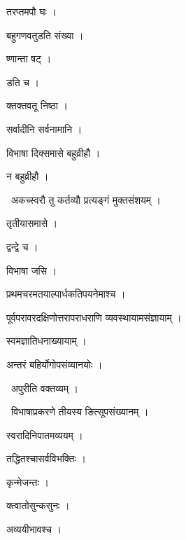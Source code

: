 \documentclass[10pt, openany, oneside]{book}
\begin{document}
\noindent तरप्तमपौ घः ।

\noindent बहुगणवतुडति संख्या ।

\noindent ष्णान्ता षट् ।

\noindent डति च ।

\noindent क्तक्तवतू निष्ठा ।

\noindent सर्वादीनि सर्वनामानि ।

\noindent विभाषा दिक्समासे बहुव्रीहौ ।

\noindent न बहुव्रीहौ ।

\par\noindent\hspace{1.5em}{\vps वा॰}~{\qt अकच्स्वरौ तु कर्तव्यौ प्रत्यङ्गं मुक्तसंशयम् ।}

\noindent तृतीयासमासे ।

\noindent द्वन्द्वे च ।

\noindent विभाषा जसि ।

\noindent प्रथमचरमतयाल्पार्धकतिपयनेमाश्च ।

\noindent पूर्वपरावरदक्षिणोत्तरापराधराणि व्यवस्थायामसंज्ञायाम् ।

\noindent स्वमज्ञातिधनाख्यायाम् ।

\noindent अन्तरं बहिर्योगोपसंव्यानयोः ।

\par\noindent\hspace{1.5em}{\vps वा॰}~{\qt अपुरीति वक्तव्यम् ।}

\par\noindent\hspace{1.5em}{\vps वा॰}~{\qt विभाषाप्रकरणे तीयस्य ङित्सूपसंख्यानम् ।}

\noindent स्वरादिनिपातमव्ययम् ।

\noindent तद्धितश्चासर्वविभक्तिः ।

\noindent कृन्मेजन्तः ।

\noindent क्त्वातोसुन्कसुनः ।

\noindent अव्ययीभावश्च ।
\end{document}
